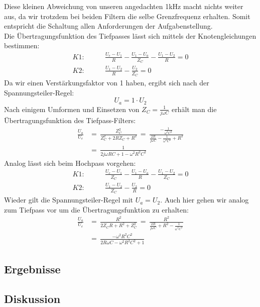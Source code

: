 Diese kleinen Abweichung von unseren angedachten 1\si{\kilo\hertz} macht nichts weiter aus, da wir trotzdem bei beiden Filtern die selbe Grenzfrequenz erhalten.
Somit entspricht die Schaltung allen Anforderungen der Aufgabenstellung.\\
Die Übertragungsfunktion des Tiefpasses lässt sich mittels der Knotengleichungen bestimmen:
\begin{align*}
K1:\qquad &\frac{U_{e}-U_{1}}{R}-\frac{U_{1}-U_{a}}{Z_{C}}-\frac{U_{1}-U_{2}}{R}=0\\
K2:\qquad &\frac{U_{1}-U_{2}}{R}-\frac{U_{2}}{Z_{C}}=0
\end{align*}
Da wir einen Verstärkungsfaktor von 1 haben, ergibt sich nach der Spannungsteiler-Regel:
$$U_{a}=1\cdot U_{2}$$
Nach einigem Umformen und Einsetzen von $Z_{C}=\frac{1}{j\omega C}$ erhält man die Übertragungsfunktion des Tiefpass-Filters:
\begin{align*}
\frac{U_{a}}{U_{e}}&=\,\frac{Z_{C}^2}{Z_{C}^2+2R Z_{C}+R^2}\,=\,\frac{-\frac{1}{\omega^2 C^2}}{\frac{2R}{j\omega C}-\frac{1}{\omega^2 C^2}+R^2}\\
&=\, \frac{1}{2j\omega RC+1-\omega^2 R^2C^2}
\end{align*}
Analog lässt sich beim Hochpass vorgehen:
\begin{align*}
K1:\qquad &\frac{U_{e}-U_{1}}{Z_{C}}-\frac{U_{1}-U_{a}}{R}-\frac{U_{1}-U_{2}}{Z_{C}}=0\\
K2:\qquad &\frac{U_{1}-U_{2}}{Z_{C}}-\frac{U_{2}}{R}=0
\end{align*}
Wieder gilt die Spannungsteiler-Regel mit $U_{a}=U_{2}$.
Auch hier gehen wir analog zum Tiefpass vor um die Übertragungsfunktion zu erhalten:
\begin{align*}
\frac{U_{a}}{U_{e}}&=\,\frac{R^2}{2Z_{C}R+R^2+Z_{C}^2}\,=\,\frac{R^2}{\frac{2R}{j\omega C}+R^2-\frac{1}{\omega^2 C^2}}\\
&=\, \frac{-\omega^2 R^2 C^2}{2R\omega C-\omega^2 R^2 C^2+1}
\end{align*} 
\subsection{Ergebnisse}

\subsection{Diskussion}


